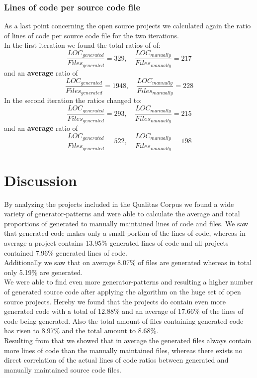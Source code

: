\subsubsection{Lines of code per source code file}
As a last point concerning the open source projects we calculated again the ratio of lines of code per source code file for the two iterations.\\
In the first iteration we found the total ratios of of:
\begin{equation}
	\frac{LOC_{generated}}{Files_{generated}} = 329 , \quad \frac{LOC_{manually}}{Files_{manually}} = 217
\end{equation}
and an \textbf{average} ratio of
\begin{equation}
	\frac{LOC_{generated}}{Files_{generated}} = 1948 , \quad \frac{LOC_{manually}}{Files_{manually}} = 228
\end{equation}
In the second iteration the ratios changed to:
\begin{equation}
\frac{LOC_{generated}}{Files_{generated}} = 293 , \quad \frac{LOC_{manually}}{Files_{manually}} = 215
\end{equation}
and an \textbf{average} ratio of
\begin{equation}
\frac{LOC_{generated}}{Files_{generated}} = 522 , \quad \frac{LOC_{manually}}{Files_{manually}} = 198
\end{equation}



\cleardoublepage{}
\section{Discussion}
By analyzing the projects included in the Qualitas Corpus we found a wide variety of generator-patterns and were able to calculate the average and total proportions of generated to manually maintained lines of code and files. We saw that generated code makes only a small portion of the lines of code, whereas in average a project contains 13.95\% generated lines of code and all projects contained 7.96\% generated lines of code.\\
Additionally we saw that on average 8.07\% of files are generated whereas in total only 5.19\% are generated.\\
We were able to find even more generator-patterns and resulting a higher number of generated source code after applying the algorithm on the huge set of open source projects. Hereby we found that the projects do contain even more generated code with a total of 12.88\% and an average of 17.66\% of the lines of code being generated. Also the total amount of files containing generated code has risen to 8.97\% and the total amount to 8.68\%.\\
Resulting from that we showed that in average the generated files always contain more lines of code than the manually maintained files, whereas there exists no direct correlation of the actual lines of code ratios between generated and manually maintained source code files.


